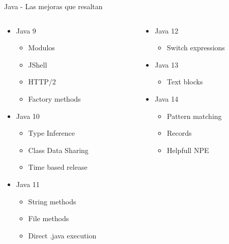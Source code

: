 \documentclass[aspectratio=169]{beamer}
\begin{document}
\begin{frame}[fragile]{Java - Las mejoras que resaltan}
	\begin{columns}[T] %
		
		\begin{column}[T]{5cm} %
			\begin{itemize}
				\item Java 9
				\begin{itemize}
					\item Modulos
					\item JShell
					\item HTTP/2
                    \item Factory methods
				\end{itemize}
				\item Java 10
				\begin{itemize}
					\item Type Inference
					\item Class Data Sharing
					\item Time based release
				\end{itemize}
                 \item Java 11
                \begin{itemize}
                    \item String methods
                    \item File methods
                    \item Direct .java execution
                \end{itemize}
			\end{itemize}
		\end{column}
		\begin{column}[T]{5cm} %
			\begin{itemize}
               
				\item Java 12
				\begin{itemize}
					\item Switch expressions
				\end{itemize}
				\item Java 13
				\begin{itemize}
					\item Text blocks
				\end{itemize}
				\item Java 14
				\begin{itemize}
					\item Pattern matching
					\item Records
					\item Helpfull NPE
				\end{itemize}
			\end{itemize}
		\end{column}
	\end{columns}
\end{frame}
\end{document}
